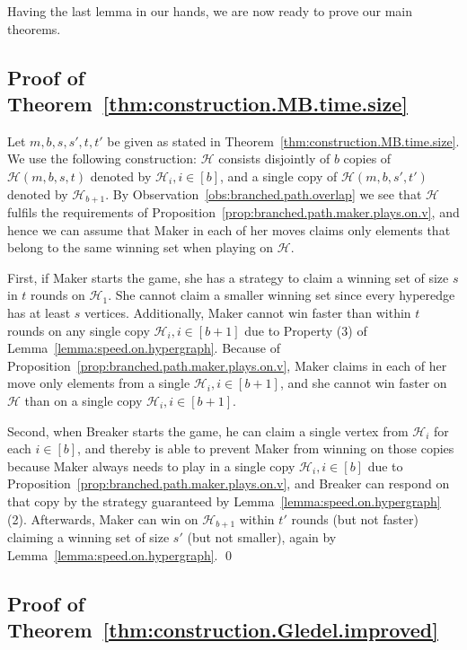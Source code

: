 \documentclass[reqno, 12pt]{amsart}
\numberwithin{equation}{section}
\numberwithin{figure}{section}
\begin{document}
Having the last lemma in our hands, we are now ready to prove our main theorems.


\subsection{Proof of Theorem~\ref{thm:construction.MB.time.size}}

Let $m,b,s,s',t,t'$ be given as stated in Theorem~\ref{thm:construction.MB.time.size}. 
We use the following construction: $\mathcal{H}$ consists disjointly of $b$ copies of $\mathcal{H}(m,b,s,t)$ denoted by $\mathcal{H}_i, i \in [b]$, and a single copy of $\mathcal{H}(m,b,s',t')$ denoted by $\mathcal{H}_{b+1}$.
 By Observation~\ref{obs:branched.path.overlap} we see that $\mathcal{H}$ fulfils the requirements of Proposition~\ref{prop:branched.path.maker.plays.on.v}, and hence we can assume that Maker in each of her moves claims only elements that belong to the same winning set when playing on $\mathcal{H}$.

First, if Maker starts the game, she has a strategy to claim a winning set of size $s$ in $t$ rounds on $\mathcal{H}_1$. She cannot claim a smaller winning set since every hyperedge has at least $s$ vertices. Additionally, Maker cannot win faster than within $t$ rounds on any single copy $\mathcal{H}_i, i \in [b+1]$ due to Property (3) of Lemma~\ref{lemma:speed.on.hypergraph}. Because of Proposition~\ref{prop:branched.path.maker.plays.on.v}, Maker claims in each of her move only elements from a single $\mathcal{H}_i, i \in [b+1]$, and she cannot win faster on $\mathcal{H}$ than on a single copy $\mathcal{H}_i, i \in [b+1]$.

Second, when Breaker starts the game, he can claim a single vertex from $\mathcal{H}_i$ for each $i \in [b]$, and thereby is able to prevent Maker from winning on those copies because Maker always needs to play in a single copy $\mathcal{H}_i, i \in [b]$ due to Proposition~\ref{prop:branched.path.maker.plays.on.v}, and Breaker can respond on that copy by the strategy guaranteed by Lemma~\ref{lemma:speed.on.hypergraph}(2). Afterwards, Maker can win on $\mathcal{H}_{b+1}$ within $t'$ rounds (but not faster) claiming a winning set of size $s'$ (but not smaller), again by Lemma~\ref{lemma:speed.on.hypergraph}. \qed




\subsection{Proof of Theorem~\ref{thm:construction.Gledel.improved}}
\end{document}
